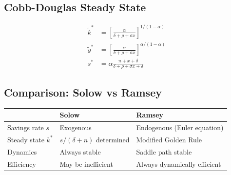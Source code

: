 \documentclass[a4paper,11pt]{article}
\newcommand{\ktilde}{\tilde{k}}
\newcommand{\ytilde}{\tilde{y}}
\begin{document}
\subsection*{Cobb-Douglas Steady State}
\begin{align*}
\ktilde^* &= \left[\frac{\alpha}{\delta+\rho+\sigma x}\right]^{1/(1-\alpha)} \\
\ytilde^* &= \left[\frac{\alpha}{\delta+\rho+\sigma x}\right]^{\alpha/(1-\alpha)} \\
s^* &= \alpha\frac{n+x+\delta}{\delta+\rho+\sigma x+\delta}
\end{align*}

\subsection*{Comparison: Solow vs Ramsey}
\begin{center}
\begin{tabular}{lll}
\toprule
& \textbf{Solow} & \textbf{Ramsey} \\
\midrule
Savings rate $s$ & Exogenous & Endogenous (Euler equation) \\
Steady state $k^*$ & $s/(\delta+n)$ determined & Modified Golden Rule \\
Dynamics & Always stable & Saddle path stable \\
Efficiency & May be inefficient & Always dynamically efficient \\
\bottomrule
\end{tabular}
\end{center}
\end{document}
